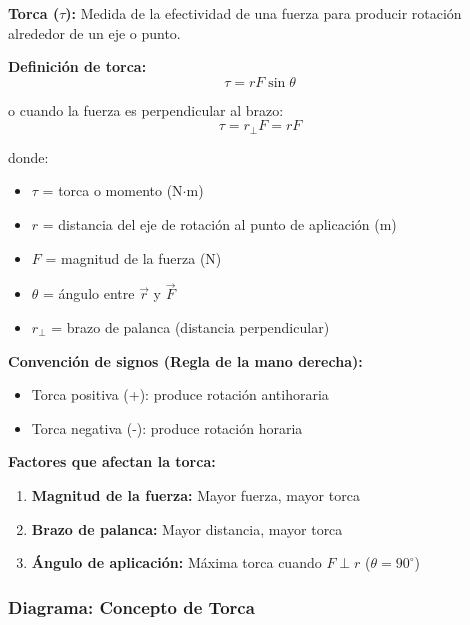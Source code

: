 \begin{seccion}
\begin{definicion}
    \textbf{Torca ($\tau$):} Medida de la efectividad de una fuerza para producir rotación alrededor de un eje o punto.
\end{definicion}

\begin{ecuacion}
\textbf{Definición de torca:}
$$\tau = r F \sin\theta$$

o cuando la fuerza es perpendicular al brazo:
$$\tau = r_\perp F = r F$$

donde:
\begin{itemize}
    \item $\tau$ = torca o momento (N$\cdot$m)
    \item $r$ = distancia del eje de rotación al punto de aplicación (m)
    \item $F$ = magnitud de la fuerza (N)
    \item $\theta$ = ángulo entre $\vec{r}$ y $\vec{F}$
    \item $r_\perp$ = brazo de palanca (distancia perpendicular)
\end{itemize}
\end{ecuacion}

\textbf{Convención de signos (Regla de la mano derecha):}
\begin{itemize}
    \item Torca positiva (+): produce rotación antihoraria 
    \item Torca negativa (-): produce rotación horaria 
\end{itemize}

\textbf{Factores que afectan la torca:}
\begin{enumerate}
    \item \textbf{Magnitud de la fuerza:} Mayor fuerza, mayor torca
    \item \textbf{Brazo de palanca:} Mayor distancia, mayor torca
    \item \textbf{Ángulo de aplicación:} Máxima torca cuando $F \perp r$ ($\theta = 90^\circ$)
\end{enumerate}
\end{seccion}

\subsubsection{Diagrama: Concepto de Torca}

